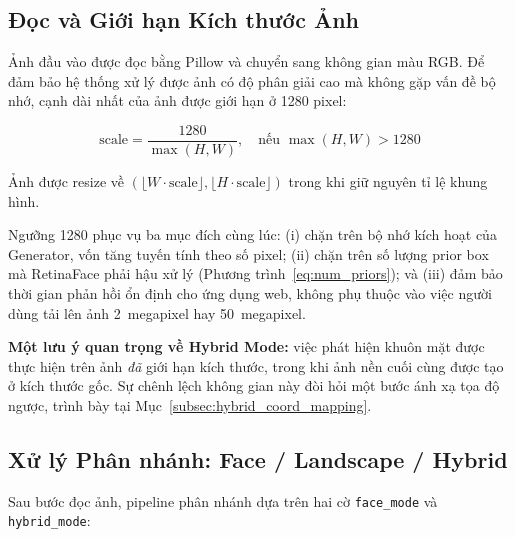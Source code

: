 \subsection{Đọc và Giới hạn Kích thước Ảnh}
\label{subsec:read_resize}

Ảnh đầu vào được đọc bằng Pillow và chuyển sang không gian màu RGB. Để đảm bảo hệ thống xử lý được ảnh có độ phân giải cao mà không gặp vấn đề bộ nhớ, cạnh dài nhất của ảnh được giới hạn ở 1280 pixel:

\begin{equation}
\label{eq:max_edge}
\text{scale} = \frac{1280}{\max(H, W)}, \quad \text{nếu } \max(H, W) > 1280
\end{equation}

Ảnh được resize về $(\lfloor W \cdot \text{scale} \rfloor, \lfloor H \cdot \text{scale} \rfloor)$ trong khi giữ nguyên tỉ lệ khung hình.

Ngưỡng 1280 phục vụ ba mục đích cùng lúc: (i) chặn trên bộ nhớ kích hoạt của Generator, vốn tăng tuyến tính theo số pixel; (ii) chặn trên số lượng prior box mà RetinaFace phải hậu xử lý (Phương trình~\ref{eq:num_priors}); và (iii) đảm bảo thời gian phản hồi ổn định cho ứng dụng web, không phụ thuộc vào việc người dùng tải lên ảnh 2~megapixel hay 50~megapixel.

\textbf{Một lưu ý quan trọng về Hybrid Mode:} việc phát hiện khuôn mặt được thực hiện trên ảnh \textit{đã} giới hạn kích thước, trong khi ảnh nền cuối cùng được tạo ở kích thước gốc. Sự chênh lệch không gian này đòi hỏi một bước ánh xạ tọa độ ngược, trình bày tại Mục~\ref{subsec:hybrid_coord_mapping}.

\subsection{Xử lý Phân nhánh: Face / Landscape / Hybrid}
\label{subsec:branching}

Sau bước đọc ảnh, pipeline phân nhánh dựa trên hai cờ \texttt{face\_mode} và \texttt{hybrid\_mode}:

